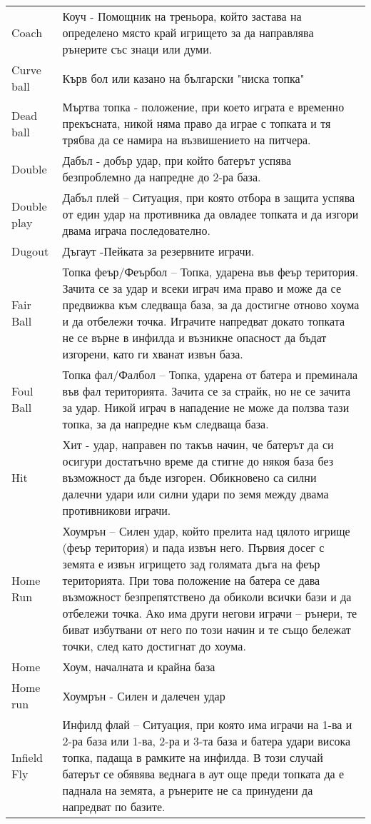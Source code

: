 \begin{longtable}{|m{6em}|m{25em}|}
Coach &Коуч - Помощник на треньора, който застава на определено място край игрището за да направлява рънерите със знаци или думи.\\ 
Curve ball &Кърв бол или казано на български "ниска топка"\\ 
Dead ball &Мъртва топка - положение, при което играта е временно прекъсната, никой няма право да играе с топката и тя трябва да се намира на възвишението на питчера.\\ 
Double &Дабъл - добър удар, при който батерът успява безпроблемно да напредне до 2-ра база.\\ 
Double play &Дабъл плей – Ситуация, при която отбора в защита успява от един удар на противника да овладее топката и да изгори двама играча последователно.\\ 
Dugout &Дъгаут -Пейката за резервните играчи.\\ 
Fair Ball &Топка феър/Феърбол – Топка, ударена във феър територия. Зачита се за удар и всеки играч има право и може да се предвижва към следваща база, за да достигне отново хоума и да отбележи точка. Играчите напредват докато топката не се върне в инфилда и възникне опасност да бъдат изгорени, като ги хванат извън база.\\ 
Foul Ball &Топка фал/Фалбол – Топка, ударена от батера и преминала във фал територията. Зачита се за страйк, но не се зачита за удар. Никой играч в нападение не може да ползва тази топка, за да напредне към следваща база.\\ 
Hit &Хит - удар, направен по такъв начин, че батерът да си осигури достатъчно време да стигне до някоя база без възможност да бъде изгорен. Обикновено са силни далечни удари или силни удари по земя между двама противникови играчи.\\ 
Home Run &Хоумрън – Силен удар, който прелита над цялото игрище (феър територия) и пада извън него. Първия досег с земята е извън игрището зад голямата дъга на феър територията. При това положение на батера се дава възможност безпрепятствено да обиколи всички бази и да отбележи точка. Ако има други негови играчи – рънери, те биват избутвани от него по този начин и те също бележат точки, след като достигнат до хоума.\\ 
Home &Хоум, началната и крайна база\\ 
Home run &Хоумрън - Силен и далечен удар\\ 
Infield Fly &Инфилд флай – Ситуация, при която има играчи на 1-ва и 2-ра база или 1-ва, 2-ра и 3-та база и батера удари висока топка, падаща в рамките на инфилда. В този случай батерът се обявява веднага в аут още преди топката да е паднала на земята, а рънерите не са принудени да напредват по базите.\\ 

\end{longtable}
